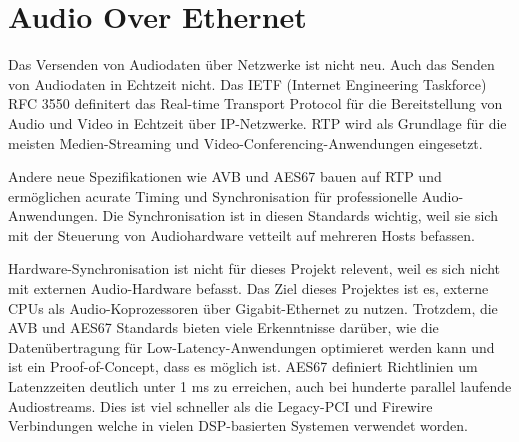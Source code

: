 \section{Audio Over Ethernet}


Das Versenden von Audiodaten über Netzwerke ist nicht neu. Auch das Senden von Audiodaten in Echtzeit nicht. Das IETF (Internet Engineering Taskforce) RFC 3550 definitert das Real-time Transport Protocol für die Bereitstellung von Audio und Video in Echtzeit über IP-Netzwerke. RTP wird als Grundlage für die meisten Medien-Streaming und Video-Conferencing-Anwendungen eingesetzt.

Andere neue Spezifikationen wie AVB und AES67 bauen auf RTP und ermöglichen acurate Timing und Synchronisation für professionelle Audio-Anwendungen. Die Synchronisation ist in diesen Standards wichtig, weil sie sich mit der Steuerung von Audiohardware vetteilt auf mehreren Hosts befassen.

Hardware-Synchronisation ist nicht für dieses Projekt relevent, weil es sich nicht mit externen Audio-Hardware befasst. Das Ziel dieses Projektes ist es, externe CPUs als Audio-Koprozessoren über Gigabit-Ethernet zu nutzen. Trotzdem, die AVB und AES67 Standards bieten viele Erkenntnisse darüber, wie die Datenübertragung für Low-Latency-Anwendungen optimieret werden kann und ist ein Proof-of-Concept, dass es möglich ist. AES67 definiert Richtlinien um Latenzzeiten deutlich unter 1 ms zu erreichen, auch bei hunderte parallel laufende Audiostreams. Dies ist viel schneller als die Legacy-PCI und Firewire Verbindungen welche in vielen DSP-basierten Systemen verwendet worden\cite{bouillot2009aes}.